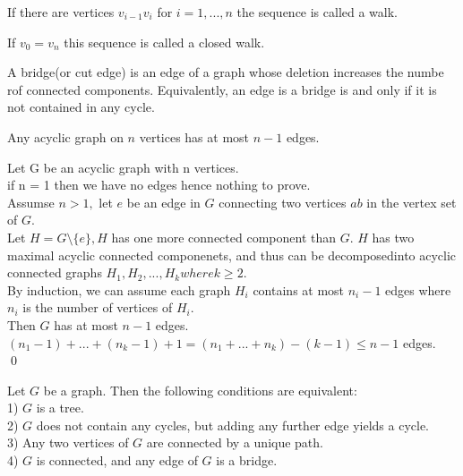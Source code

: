\documentclass[../main.tex]{subfiles}
\begin{document}
\begin{defn}[Walk]
If there are vertices $v_{i-1}v_i$ for $i = 1, ..., n$ the sequence is called a walk.
\end{defn}

\begin{defn}
If $v_0 = v_n$ this sequence is called a closed walk.
\end{defn}

\begin{defn}[Bridge]
A bridge(or cut edge) is an edge of a graph whose deletion increases the numbe rof connected components. Equivalently, an edge is a bridge is and only if it is not contained in any cycle.
\end{defn}

\begin{lem}
Any acyclic graph on $n$ vertices has at most $n-1$ edges.
\end{lem}
\noindent\Proof Let G be an acyclic graph with n vertices.\\
\noindent if n = 1 then we have no edges hence nothing to prove.\\
\noindent Assumse $n>1,$ let $e$ be an edge in $G$ connecting two vertices $ab$ in the vertex set of $G.$\\
\noindent Let $H = G \setminus \{e\}, H$ has one more connected component than $G.$ $H$ has two maximal acyclic connected componenets, and thus can be decomposedinto acyclic connected graphs $H_1, H_2, ..., H_k where k \geq 2.$\\
\noindent By induction, we can assume each graph $H_i$ contains at most $n_i - 1$ edges where $n_i$ is the number of vertices of $H_i.$\\
\noindent Then $G$ has at most $n-1$ edges.\\
\noindent $(n_1 - 1) + ... + (n_k - 1) + 1 = (n_1 + ... + n_k) - (k - 1) \leq n - 1$ edges.
\\ \qed

 \begin{lem}
 Let $G$ be a graph. Then the following conditions are equivalent:\\
 1) $G$ is a tree.\\
 2) $G$ does not contain any cycles, but adding any further edge yields a cycle.\\
 3) Any two vertices of $G$ are connected by a unique path.\\
 4) $G$ is connected, and any edge of $G$ is a bridge.
 \end{lem}
 
\end{document}
